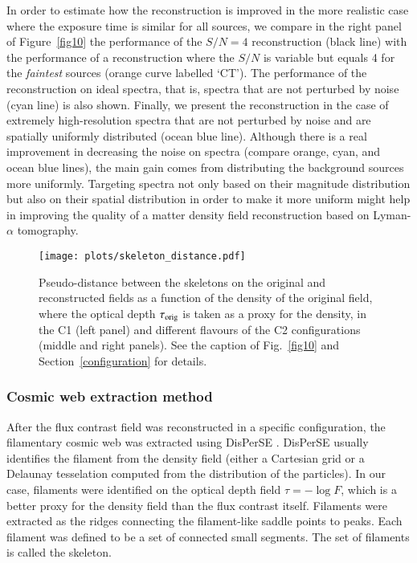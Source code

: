 \documentclass{aa}
\begin{document}
In order to estimate how the reconstruction is improved in the more realistic case where the exposure time is similar for all sources, we compare in the right panel of Figure~\ref{fig10} the performance of the $S/N=4$ reconstruction (black line) with the performance of a reconstruction where the $S/N$ is variable but equals 4 for the \textit{\textup{faintest}} sources (orange curve labelled `CT'). The performance of the reconstruction on ideal spectra, that is, spectra that are not perturbed by noise (cyan line) is also shown. Finally, we present the reconstruction in the case of extremely high-resolution spectra that are not perturbed by noise and are spatially uniformly distributed (ocean blue line). Although there is a real improvement in decreasing the noise on spectra (compare orange, cyan, and ocean blue lines), the main gain comes from distributing the background sources more uniformly. Targeting spectra not only based on their magnitude distribution but also on their spatial distribution in order to make it more uniform might help in improving the quality of a matter density field reconstruction based on Lyman-$\alpha$ tomography. 

\begin{figure*}
\begin{center}
\texttt{[image: plots/skeleton\_distance.pdf]}
\caption{Pseudo-distance between the skeletons on the original and reconstructed fields as a function of the density of the original field, where the optical depth $\tau_{\rm orig}$ is taken as a proxy for the density, in the C1 (left panel) and different flavours of the C2 configurations (middle and right panels). See the caption of Fig.~\ref{fig10} and Section~\ref{configuration} for details.}
\label{fig11}
\end{center}
\end{figure*}

\subsubsection{Cosmic web extraction method}


After the flux contrast field was reconstructed in a specific configuration, the filamentary cosmic web was extracted using {\sc DisPerSE} \citep{Sousbie2011,sousbieetal2011}. {\sc DisPerSE} usually identifies the filament from the density field (either a Cartesian grid or  a Delaunay tesselation computed from the distribution of the particles). In our case, filaments were identified on the optical depth field $\tau=-\log F$, which is a better proxy for the density field than the flux contrast itself. 
Filaments were extracted as the ridges connecting the filament-like saddle points to peaks. Each filament was  defined to be a set of connected small segments. The set of filaments is called the skeleton. 
\end{document}
